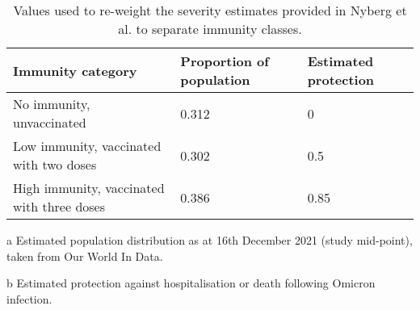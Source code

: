 \begin{table}
    \begin{threeparttable}
    \begin{tabularx}{\textwidth}{| X | X | X |}
        \hline
        Immunity category & Proportion of population \tnote{a} & Estimated protection \tnote{b} \\
        \hline
        No immunity, unvaccinated & 0.312 & 0 \\
        \hline
        Low immunity, vaccinated with two doses & 0.302 & 0.5 \\
        \hline
        High immunity, vaccinated with three doses & 0.386 & 0.85 \\
        \hline
	\end{tabularx}
	\caption{Values used to re-weight the severity estimates provided in Nyberg et al. to separate immunity classes.}
	\label{tab:immunity_weighting}
    \begin{tablenotes}
        \item[a] Estimated population distribution as at 16th December 2021 (study mid-point),
        taken from Our World In Data.
        \item[b] Estimated protection against hospitalisation or death following Omicron infection.
    \end{tablenotes}
    \end{threeparttable}
\end{table}

